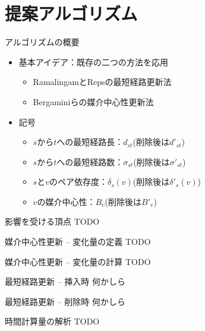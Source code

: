 \documentclass[dvipdfmx,fleqn]{beamer}
\begin{document}
\section{提案アルゴリズム}
\begin{frame}{アルゴリズムの概要}
  \begin{itemize}
  \item 基本アイデア：既存の二つの方法を応用
    \begin{itemize}
    \item RamalingamとRepsの最短経路更新法
    \item Bergaminiらの媒介中心性更新法
    \end{itemize}
  \end{itemize}
  \begin{itemize}
  \item 記号
    \begin{itemize}
    \item $s$から$t$への最短経路長：$d_{st}$(削除後は$d'_{st}$)
    \item $s$から$t$への最短経路数：$\sigma_{st}$(削除後は$\sigma'_{st}$)
    \item $s$と$v$のペア依存度：$\delta_{s}(v)$(削除後は$\delta'_{s}(v)$)
    \item $v$の媒介中心性：$B_v$(削除後は$B'_v$)
    \end{itemize}
  \end{itemize}
\end{frame}

\begin{frame}{影響を受ける頂点}
  \alert{TODO}
\end{frame}

\begin{frame}{媒介中心性更新 -- 変化量の定義}
  \alert{TODO}
\end{frame}

\begin{frame}{媒介中心性更新 -- 変化量の計算}
  \alert{TODO}
\end{frame}

\begin{frame}{最短経路更新 -- \alert{挿入時}}
  \alert{何かしら}
\end{frame}

\begin{frame}{最短経路更新 -- \alert{削除時}}
  \alert{何かしら}
\end{frame}

\begin{frame}{時間計算量の解析}
  \alert{TODO}
\end{frame}
\end{document}

